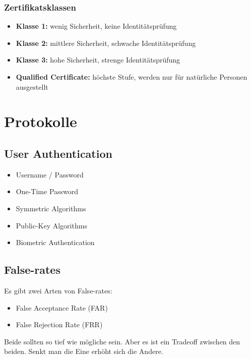 \documentclass[12pt]{scrartcl}
\begin{document}
\subsubsection{Zertifikatsklassen}

\begin{itemize}
    \item \textbf{Klasse 1:} wenig Sicherheit, keine Identitätsprüfung
    \item \textbf{Klasse 2:} mittlere Sicherheit, schwache Identitätsprüfung
    \item \textbf{Klasse 3:} hohe Sicherheit, strenge Identitätsprüfung
    \item \textbf{Qualified Certificate:} höchste Stufe, werden nur für natürliche Personen ausgestellt
\end{itemize}


\newpage
\section{Protokolle}


\subsection{User Authentication}

\begin{itemize}
    \item Username / Password
    \item One-Time Password
    \item Symmetric Algorithms
    \item Public-Key Algorithms
    \item Biometric Authentication
\end{itemize}

\vspace{0.5cm}
\subsection{False-rates}
Es gibt zwei Arten von False-rates:
\begin{itemize}
    \item False Acceptance Rate (FAR)
    \item False Rejection Rate (FRR)
\end{itemize}

Beide sollten so tief wie mögliche sein. Aber es ist ein Tradeoff zwischen den beiden.
Senkt man die Eine erhöht sich die Andere.
\end{document}
